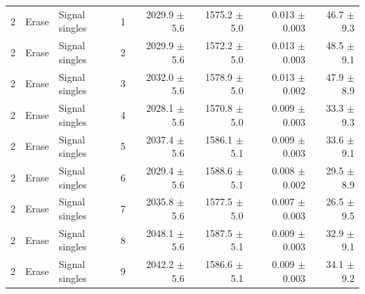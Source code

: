 \begin{tabular}{llllrrrr}
\midrule
2 & Erase & Signal singles & 1 & 2029.9 \ensuremath{\pm} 5.6 & 1575.2 \ensuremath{\pm} 5.0 & 0.013 \ensuremath{\pm} 0.003 & 46.7 \ensuremath{\pm} 9.3 \\
2 & Erase & Signal singles & 2 & 2029.9 \ensuremath{\pm} 5.6 & 1572.2 \ensuremath{\pm} 5.0 & 0.013 \ensuremath{\pm} 0.003 & 48.5 \ensuremath{\pm} 9.1 \\
2 & Erase & Signal singles & 3 & 2032.0 \ensuremath{\pm} 5.6 & 1578.9 \ensuremath{\pm} 5.0 & 0.013 \ensuremath{\pm} 0.002 & 47.9 \ensuremath{\pm} 8.9 \\
2 & Erase & Signal singles & 4 & 2028.1 \ensuremath{\pm} 5.6 & 1570.8 \ensuremath{\pm} 5.0 & 0.009 \ensuremath{\pm} 0.003 & 33.3 \ensuremath{\pm} 9.3 \\
2 & Erase & Signal singles & 5 & 2037.4 \ensuremath{\pm} 5.6 & 1586.1 \ensuremath{\pm} 5.1 & 0.009 \ensuremath{\pm} 0.003 & 33.6 \ensuremath{\pm} 9.1 \\
2 & Erase & Signal singles & 6 & 2029.4 \ensuremath{\pm} 5.6 & 1588.6 \ensuremath{\pm} 5.1 & 0.008 \ensuremath{\pm} 0.002 & 29.5 \ensuremath{\pm} 8.9 \\
2 & Erase & Signal singles & 7 & 2035.8 \ensuremath{\pm} 5.6 & 1577.5 \ensuremath{\pm} 5.0 & 0.007 \ensuremath{\pm} 0.003 & 26.5 \ensuremath{\pm} 9.5 \\
2 & Erase & Signal singles & 8 & 2048.1 \ensuremath{\pm} 5.6 & 1587.5 \ensuremath{\pm} 5.1 & 0.009 \ensuremath{\pm} 0.003 & 32.9 \ensuremath{\pm} 9.1 \\
2 & Erase & Signal singles & 9 & 2042.2 \ensuremath{\pm} 5.6 & 1586.6 \ensuremath{\pm} 5.1 & 0.009 \ensuremath{\pm} 0.003 & 34.1 \ensuremath{\pm} 9.2 \\
\bottomrule
\end{tabular}
